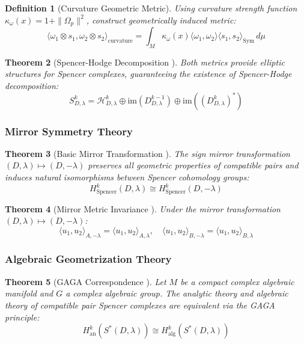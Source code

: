 \documentclass[a4paper,12pt]{extarticle}
\theoremstyle{plain}
\newtheorem{theorem}{Theorem}[section]
\newtheorem{definition}[theorem]{Definition}
\theoremstyle{definition}
\begin{document}
\begin{definition}[Curvature Geometric Metric]
\label{def:curvature-metric}
Using curvature strength function $\kappa_\omega(x) = 1 + \|\Omega_p\|^2$, construct geometrically induced metric:
$$\langle\omega_1 \otimes s_1, \omega_2 \otimes s_2\rangle_{\mathrm{curvature}} = \int_M \kappa_\omega(x) \langle\omega_1, \omega_2\rangle \langle s_1, s_2\rangle_{\mathrm{Sym}} \, d\mu$$
\end{definition}

\begin{theorem}[Spencer-Hodge Decomposition \cite{zheng2025constructing}]
\label{thm:spencer-hodge}
Both metrics provide elliptic structures for Spencer complexes, guaranteeing the existence of Spencer-Hodge decomposition:
$$S^k_{D,\lambda} = \mathcal{H}^k_{D,\lambda} \oplus \mathrm{im}(D^{k-1}_{D,\lambda}) \oplus \mathrm{im}((D^k_{D,\lambda})^*)$$
\end{theorem}

\subsubsection{Mirror Symmetry Theory \cite{zheng2025mirror}}

\begin{theorem}[Basic Mirror Transformation \cite{zheng2025mirror}]
\label{thm:basic-mirror}
The sign mirror transformation $(D,\lambda) \mapsto (D,-\lambda)$ preserves all geometric properties of compatible pairs and induces natural isomorphisms between Spencer cohomology groups:
$$H^k_{\mathrm{Spencer}}(D,\lambda) \cong H^k_{\mathrm{Spencer}}(D,-\lambda)$$
\end{theorem}

\begin{theorem}[Mirror Metric Invariance \cite{zheng2025analytic}]
\label{thm:mirror-metric-invariance}
Under the mirror transformation $(D,\lambda) \mapsto (D,-\lambda)$:
$$\langle u_1, u_2 \rangle_{A,-\lambda} = \langle u_1, u_2 \rangle_{A,\lambda}, \quad \langle u_1, u_2 \rangle_{B,-\lambda} = \langle u_1, u_2 \rangle_{B,\lambda}$$
\end{theorem}

\subsubsection{Algebraic Geometrization Theory \cite{zheng2025spencer-riemann-roch}}

\begin{theorem}[GAGA Correspondence \cite{zheng2025spencer-riemann-roch}]
\label{thm:gaga}
Let $M$ be a compact complex algebraic manifold and $G$ a complex algebraic group. The analytic theory and algebraic theory of compatible pair Spencer complexes are equivalent via the GAGA principle:
$$H^k_{\mathrm{an}}(S^*(D,\lambda)) \cong H^k_{\mathrm{alg}}(S^*(D,\lambda))$$
\end{theorem}
\end{document}
